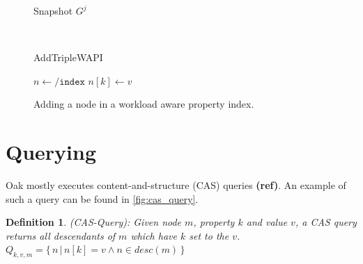 \documentclass[abstracton,12pt]{scrreprt}
\newtheorem{definition}{Definition}
\begin{document}
\begin{figure}[h]
\begin{multicols}{2}
\begin{scriptsize}
\begin{multicols}{2}
\begin{center}
                        Snapshot $G^j$
                    \end{center}    
                \end{multicols}
            \end{scriptsize}
            \columnbreak
            \ 

            \vspace{12.2mm}
            \begin{algorithm}[H]
                \label{algo:add_triple_wapi}
                \caption{AddTripleWAPI}
                \DontPrintSemicolon
                \begin{footnotesize}
                    \vspace{2.6mm}
                    $n \longleftarrow \texttt{/index}$\;
                    $n[k] \longleftarrow v$
                \end{footnotesize}
            \end{algorithm}
        \end{multicols}
    \caption{Adding a node in a workload aware property index.}
    \label{fig:add_wapi}
\end{figure}

\section{Querying}

Oak mostly executes content-and-structure (CAS) queries \textbf{(ref)}.
An example of such a query can be found in \cref{fig:cas_query}.

\begin{definition}
    (CAS-Query): Given node $m$, property $k$ and value $v$, a CAS query returns all descendants of $m$ which have $k$ set to the $v$.
    {\large$Q_{k,v,m} = \{ \, n \, | \, n[k] = v \land n \in desc(m) \, \} $}
\end{definition}
\end{document}
